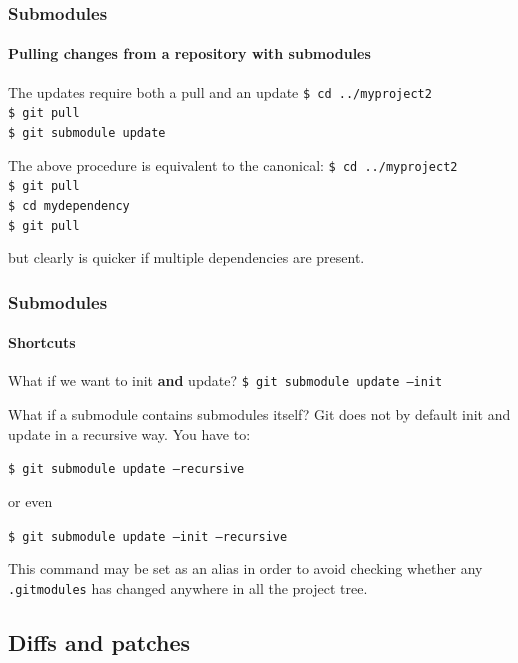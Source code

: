 \begin{frame}
\frametitle{Submodules}
\framesubtitle{Pulling changes from a repository with submodules}

\begin{block}{The updates require both a pull and an update}
\texttt{\$ cd ../myproject2} \\
\texttt{\$ git pull} \\
\texttt{\$ git submodule update}
\end{block}
\pause
\begin{block}{The above procedure is equivalent to the canonical:}
\texttt{\$ cd ../myproject2} \\
\texttt{\$ git pull} \\
\texttt{\$ cd mydependency} \\
\texttt{\$ git pull}

\medskip
but clearly is quicker if multiple dependencies are present.
\end{block}

\end{frame}

\begin{frame}
\frametitle{Submodules}
\framesubtitle{Shortcuts}

\begin{block}{What if we want to init {\bfseries and} update?}
\texttt{\$ git submodule update ---init} \\
\end{block}
\pause
\begin{block}{What if a submodule contains submodules itself?}
Git does not by default init and update in a recursive way. You have to:

\medskip
\texttt{\$ git submodule update ---recursive} \\
\medskip

or even

\medskip
\texttt{\$ git submodule update ---init ---recursive} \\
\medskip

This command may be set as an alias in order to avoid checking whether any \texttt{.gitmodules} 
has changed anywhere in all the project tree.
\end{block}

\end{frame}

\subsection{Diffs and patches}


